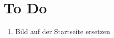 \section{To Do}
\label{sec:to_do}

\begin{enumerate}
	\item Bild auf der Startseite ersetzen
\end{enumerate}


